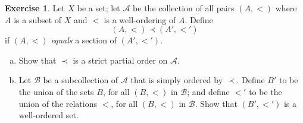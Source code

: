 \documentclass[11pt,a4paper,twoside]{article}
\theoremstyle{definition}
\newcounter{excounter}
\newtheorem{exercise}[excounter]{Exercise}
\theoremstyle{plain}
\begin{document}
\begin{exercise}

  Let $X$ be a set; let $\mathscr{A}$ be the collection of all pairs $( A, < )$ where $A$ is
  a subset of $X$ and $<$ is a well-ordering of $A$. Define
  \begin{equation*}
    ( A, < ) \prec ( A', <' )
  \end{equation*}
  if $( A, < )$ \emph{equals} a section of $(A', <')$.
  \begin{enumerate}[(a)]

    \item Show that $\prec$ is a strict partial order on $\mathscr{A}$.

    \item Let $\mathscr{B}$ be a subcollection of $\mathscr{A}$ that is simply ordered by $\prec$.
      Define $B'$ to be the union of the sets $B$, for all $( B, < )$ in $\mathscr{B}$; and define
      $<'$ to be the union of the relations $<$, for all $( B, < )$ in $\mathscr{B}$. Show that
      $( B', <' )$ is a well-ordered set.

  \end{enumerate}

\end{exercise}
\end{document}

